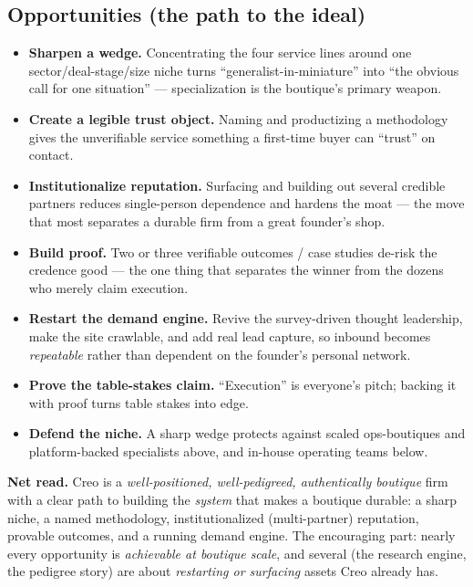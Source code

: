 \documentclass[11pt]{article}
\begin{document}
\subsection{Opportunities (the path to the ideal)}
\begin{itemize}
  \item \textbf{Sharpen a wedge.} Concentrating the four service lines around one
  sector/deal-stage/size niche turns ``generalist-in-miniature'' into ``the obvious call for
  one situation'' --- specialization is the boutique's primary weapon.
  \item \textbf{Create a legible trust object.} Naming and productizing a methodology gives
  the unverifiable service something a first-time buyer can ``trust'' on contact.
  \item \textbf{Institutionalize reputation.} Surfacing and building out several credible
  partners reduces single-person dependence and hardens the moat --- the move that most
  separates a durable firm from a great founder's shop.
  \item \textbf{Build proof.} Two or three verifiable outcomes / case studies de-risk the
  credence good --- the one thing that separates the winner from the dozens who merely claim
  execution.
  \item \textbf{Restart the demand engine.} Revive the survey-driven thought leadership,
  make the site crawlable, and add real lead capture, so inbound becomes \emph{repeatable}
  rather than dependent on the founder's personal network.
  \item \textbf{Prove the table-stakes claim.} ``Execution'' is everyone's pitch; backing
  it with proof turns table stakes into edge.
  \item \textbf{Defend the niche.} A sharp wedge protects against scaled ops-boutiques and
  platform-backed specialists above, and in-house operating teams below.
\end{itemize}

\begin{takeaway}
\textbf{Net read.} Creo is a \emph{well-positioned, well-pedigreed, authentically boutique}
firm with a clear path to building the \emph{system} that makes a boutique durable: a sharp
niche, a named methodology, institutionalized (multi-partner) reputation, provable outcomes,
and a running demand engine. The encouraging part: nearly every opportunity is
\emph{achievable at boutique scale}, and several (the research engine, the pedigree story)
are about \emph{restarting or surfacing} assets Creo already has.
\end{takeaway}
\end{document}
